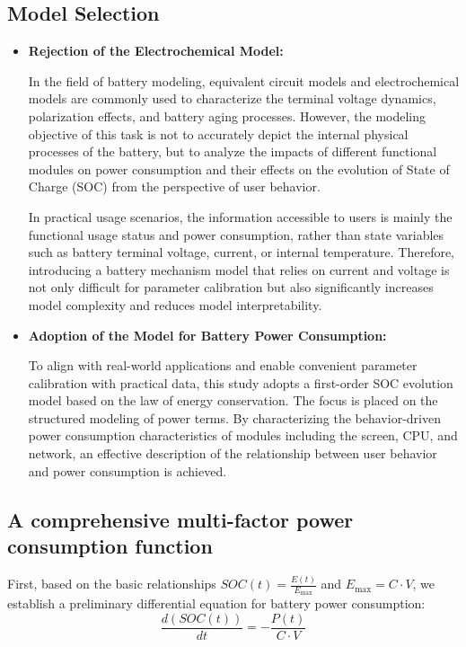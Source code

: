 \documentclass{mcmthesis}  %
\begin{document}
	\subsection{Model Selection}
	\begin{itemize} [listparindent=2em]
		\item \textbf{Rejection of the Electrochemical Model:}
		
		In the field of battery modeling, equivalent circuit models and electrochemical models are commonly used to characterize the terminal voltage dynamics, polarization effects, and battery aging processes. However, the modeling objective of this task is not to accurately depict the internal physical processes of the battery, but to analyze the impacts of different functional modules on power consumption and their effects on the evolution of State of Charge (SOC) from the perspective of user behavior.
		
		In practical usage scenarios, the information accessible to users is mainly the functional usage status and power consumption, rather than state variables such as battery terminal voltage, current, or internal temperature. Therefore, introducing a battery mechanism model that relies on current and voltage is not only difficult for parameter calibration but also significantly increases model complexity and reduces model interpretability.
		
		\item \textbf{Adoption of the Model for Battery Power Consumption:}
		
		To align with real-world applications and enable convenient parameter calibration with practical data, this study adopts a first-order SOC evolution model based on the law of energy conservation. The focus is placed on the structured modeling of power terms. By characterizing the behavior-driven power consumption characteristics of modules including the screen, CPU, and network, an effective description of the relationship between user behavior and power consumption is achieved.
		\end{itemize}
	
	\subsection{A comprehensive multi-factor power consumption function}
	First, based on the basic relationships $SOC(t)=\frac{E(t)}{E_{\max}}$ and $E_{\max}=C\cdot V$, we establish a preliminary differential equation for battery power consumption:
	\begin{equation}
		\frac{d(SOC(t))}{dt} = -\frac{P(t)}{C \cdot V}
	\end{equation}
	
\end{document}
